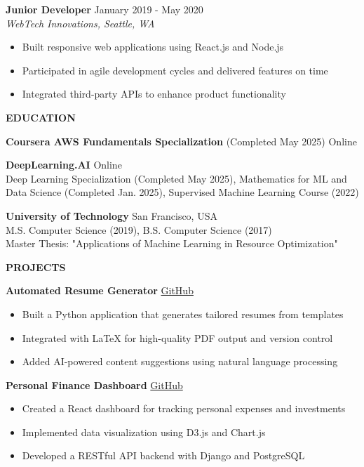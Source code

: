 \documentclass[11pt]{article}
\begin{document}
\textbf{Junior Developer} \hfill January 2019 - May 2020\\
\textit{WebTech Innovations, Seattle, WA}
\begin{itemize}[leftmargin=*, nosep]
    \item Built responsive web applications using React.js and Node.js
    \item Participated in agile development cycles and delivered features on time
    \item Integrated third-party APIs to enhance product functionality
\end{itemize}

\begin{center} 
    \textbf{EDUCATION} 
\end{center}
\hypertarget{education}{}

\textbf{Coursera AWS Fundamentals Specialization} (Completed May 2025) \hfill Online

\vspace{4pt}

\textbf{DeepLearning.AI} \hfill Online\\
Deep Learning Specialization (Completed May 2025), Mathematics for ML and Data Science (Completed Jan. 2025), Supervised Machine Learning Course (2022)
\vspace{4pt}

\textbf{University of Technology} \hfill San Francisco, USA\\
M.S. Computer Science (2019), B.S. Computer Science (2017)\\
Master Thesis: "Applications of Machine Learning in Resource Optimization"

\begin{center} 
    \textbf{\uppercase{Projects}}
\end{center}
\hypertarget{projects}{}
\textbf{Automated Resume Generator} \hfill \href{https://github.com/johndoe/resume-generator}{GitHub}
\begin{itemize}[leftmargin=*, nosep]
    \item Built a Python application that generates tailored resumes from templates
    \item Integrated with LaTeX for high-quality PDF output and version control
    \item Added AI-powered content suggestions using natural language processing
\end{itemize}

\textbf{Personal Finance Dashboard} \hfill \href{https://github.com/johndoe/finance-dash}{GitHub}
\begin{itemize}[leftmargin=*, nosep]
    \item Created a React dashboard for tracking personal expenses and investments
    \item Implemented data visualization using D3.js and Chart.js
    \item Developed a RESTful API backend with Django and PostgreSQL
\end{itemize}
\end{document}
